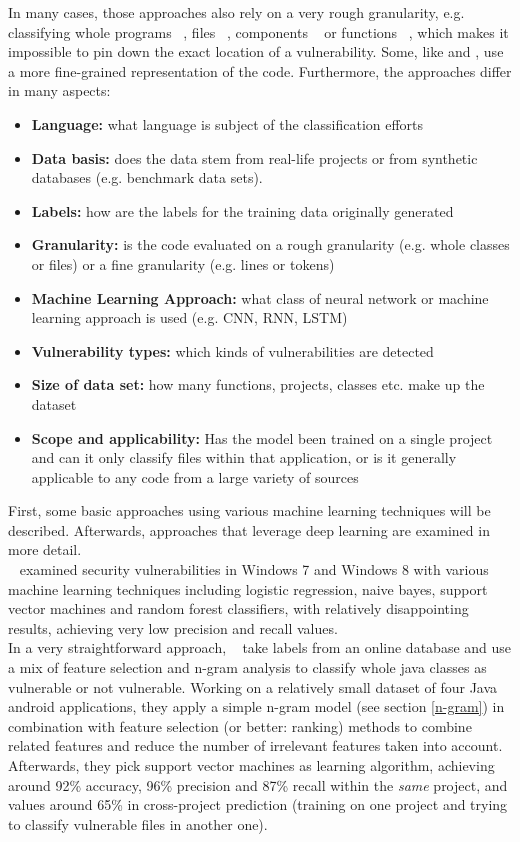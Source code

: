 \documentclass[
	a4paper,
	pagesize,
	pdftex,
	12pt,
	twoside, %
	BCOR=5mm, %
	ngerman,
	fleqn,
	final,
	]{scrartcl}
\begin{document}
In many cases, those approaches also rely on a very rough granularity, e.g. classifying whole programs ~\cite{Grieco.2016}, files ~\cite{Shin.2010}, components ~\cite{Neuhaus.2007} or functions ~\cite{Yamaguchi.2011}, which makes it impossible to pin down the exact location of a vulnerability. Some, like \cite{Li.2018} and \cite{Russell.2018}, use a more fine-grained representation of the code. Furthermore, the approaches differ in many aspects:
\begin{itemize}
	\item \textbf{Language:} what language is subject of the classification efforts
	\item \textbf{Data basis:} does the data stem from real-life projects or from synthetic databases (e.g. benchmark data sets).
	\item \textbf{Labels:} how are the labels for the training data originally generated
	\item \textbf{Granularity:} is the code evaluated on a rough granularity (e.g. whole classes or files) or a fine granularity (e.g. lines or tokens)
	\item \textbf{Machine Learning Approach:} what class of neural network or machine learning approach is used (e.g. CNN, RNN, LSTM)
	\item \textbf{Vulnerability types:} which kinds of vulnerabilities are detected
	\item \textbf{Size of data set:} how many functions, projects, classes etc. make up the dataset
	\item \textbf{Scope and applicability:} Has the model been trained on a single project and can it only classify files within that application, or is it generally applicable to any code from a large variety of sources
\end{itemize}
First, some basic approaches using various machine learning techniques will be described. Afterwards, approaches that leverage deep learning are examined in more detail.\\
~\cite{Morrison.2015} examined security vulnerabilities in Windows 7 and Windows 8 with various machine learning techniques including logistic regression, naive bayes, support vector machines and random forest classifiers, with relatively disappointing results, achieving very low precision and recall values.\\
In a very straightforward approach, ~\cite{Pang.2015} take labels from an online database and use a mix of feature selection and n-gram analysis to classify whole java classes as vulnerable or not vulnerable. Working on a relatively small dataset of four Java android applications, they apply a simple n-gram model (see section \ref{n-gram}) in combination with feature selection (or better: ranking) methods to combine related features and reduce the number of irrelevant features taken into account. Afterwards, they pick support vector machines as learning algorithm, achieving around 92\% accuracy, 96\% precision and 87\% recall within the \textit{same} project, and values around 65\% in cross-project prediction (training on one project and trying to classify vulnerable files in another one).\\
\end{document}
